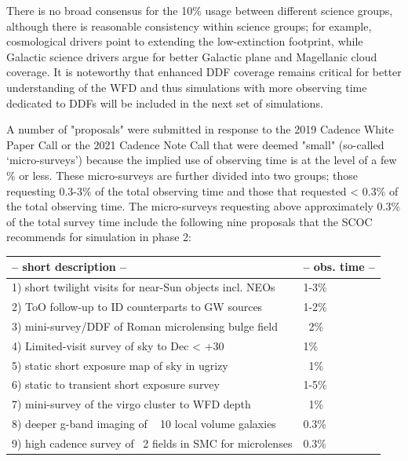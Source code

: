 There is no broad consensus for the 10\% usage between different science groups, although there is reasonable consistency within science groups; for example, cosmological drivers point to extending the low-extinction footprint, while Galactic science drivers argue for better Galactic plane and Magellanic cloud coverage. It is noteworthy that enhanced DDF coverage remains critical for better understanding of the WFD and thus simulations with more observing time dedicated to DDFs will be included in the next set of simulations. 

A number of "proposals" were submitted in response to the 2019 Cadence White Paper Call or the 2021 Cadence Note Call that were deemed "small" (so-called ‘micro-surveys’) because the implied use of observing time is at the level of a few \% or less. These micro-surveys are further divided into two groups; those requesting 0.3-3\% of the total observing time and those that requested < 0.3\% of the total observing time. The micro-surveys requesting above approximately 0.3\% of the total survey time include the following nine proposals that the SCOC recommends for simulation in phase 2:

\begin{table}[h]
\begin{tabular}{l | l}
             -- short description --             &                          -- obs. time -- \\
\hline
1) short twilight visits for near-Sun objects incl. NEOs      &   1-3\%  \\
2) ToO follow-up to ID counterparts to GW sources           &  1-2\% \\
3) mini-survey/DDF of Roman microlensing bulge field      &   ~2\% \\ 
4) Limited-visit survey of sky to Dec < +30                          &    1\% \\ 
5) static short exposure map of sky in ugrizy                     &  ~1\% \\
6) static to transient short exposure survey                         & 1-5\% \\
7) mini-survey of the virgo cluster to WFD depth                 &  ~1\% \\
8) deeper g-band imaging of ~ 10 local volume galaxies     & 0.3\% \\
9) high cadence survey of ~2 fields in SMC for microlenses&  0.3\% \\
\hline
\end{tabular}
\end{table}
  
